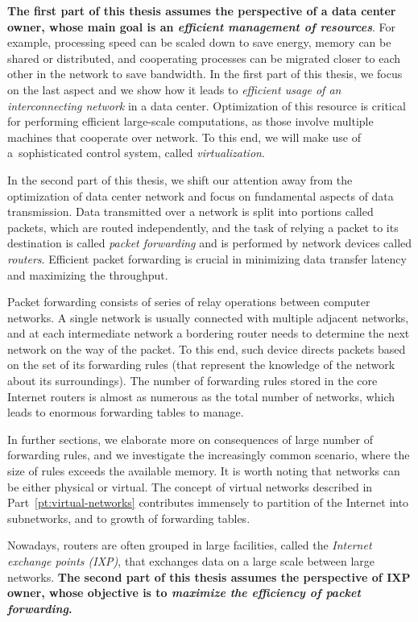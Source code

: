 \textbf{The first part of this thesis assumes the perspective of a data center owner, whose main goal is an \emph{efficient management of resources}}.
For example, processing speed can be scaled down to save energy, memory can be shared or distributed, and cooperating processes can be migrated closer to each other in the network to save bandwidth.
In the first part of this thesis, we focus on the last aspect and we show how it leads to
\emph{efficient usage of an interconnecting network} in a data center.
Optimization of this resource is critical for performing efficient large-scale computations, as those involve multiple machines that cooperate over network.
To this end, we will make use of a~sophisticated control system, called \emph{virtualization}.


In the second part of this thesis, we shift our attention away from the optimization of data center network and focus on fundamental aspects of data transmission.
Data transmitted over a network is split into portions called packets, which are routed independently, and the task of relying a packet to its destination is called \emph{packet forwarding} and is performed by network devices called \emph{routers}.
Efficient packet forwarding is crucial in minimizing data transfer latency and maximizing the throughput.

Packet forwarding consists of series of relay operations between computer networks.
A single network is usually connected with multiple adjacent networks, and at each intermediate network a bordering router needs to determine the next network on the way of the packet.
To this end, such device directs packets based on the set of its forwarding rules (that represent the knowledge of the network about its surroundings).
The number of forwarding rules stored in the core Internet routers is almost as numerous as the total number of networks, which leads to enormous forwarding tables to manage.

In further sections, we elaborate more on consequences of large number of forwarding rules, and we investigate the increasingly common scenario, where the size of rules exceeds the available memory.
It is worth noting that networks can be either physical or virtual.
The concept of virtual networks described in Part~\ref{pt:virtual-networks} contributes immensely to partition of the Internet into subnetworks, and to growth of forwarding tables.

Nowadays, routers are often grouped in large facilities, called the \emph{Internet exchange points (IXP)}, that exchanges data on a large scale between large networks.
\textbf{The second part of this thesis assumes the perspective of IXP owner, whose objective is to \emph{maximize the efficiency of packet forwarding}.}


